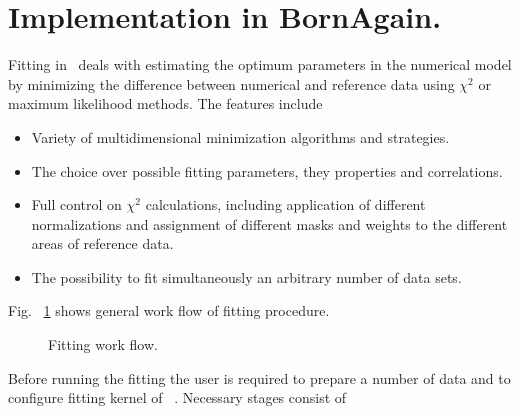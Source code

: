 %
\section{Implementation in BornAgain.} 

Fitting in  \BornAgain\ deals with estimating the optimum parameters
in the numerical model by minimizing the difference between
numerical and reference data using $\chi^2$  or maximum likelihood methods. The features include 

\begin{itemize}
\item Variety of multidimensional minimization algorithms and strategies.
\item The choice over possible fitting parameters, they properties and correlations.
\item Full control on $\chi^2$ calculations, including application of different normalizations and assignment of different masks and weights to the different areas of reference data.
\item The possibility to fit simultaneously an arbitrary number of data sets.
\end{itemize}

Fig. ~\ref{fig:minimization_workflow} shows general work flow of fitting procedure.
\begin{figure}[htbp]
\centering
\caption{
Fitting work flow.
}
\label{fig:minimization_workflow}
\end{figure}
Before running the fitting the user is required to prepare a number of data and to
configure fitting kernel of \BornAgain\ . Necessary stages consist of

